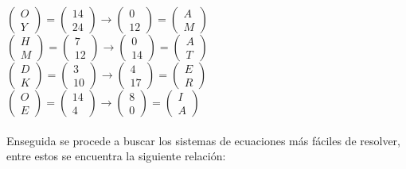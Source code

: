 \documentclass[12pt, letterpaper]{article}
\begin{document}
$
\begin{pmatrix}
O \\ Y 
\end{pmatrix}
=
\begin{pmatrix}
14 \\ 24
\end{pmatrix}
\longrightarrow
\begin{pmatrix}
0 \\ 12 
\end{pmatrix}
=
\begin{pmatrix}
A \\ M
\end{pmatrix}
$\\
$
\begin{pmatrix}
H \\ M 
\end{pmatrix}
=
\begin{pmatrix}
7 \\ 12
\end{pmatrix}
\longrightarrow
\begin{pmatrix}
0 \\ 14 
\end{pmatrix}
=
\begin{pmatrix}
A \\ T
\end{pmatrix}
$\\
$
\begin{pmatrix}
D \\ K 
\end{pmatrix}
=
\begin{pmatrix}
3 \\ 10
\end{pmatrix}
\longrightarrow
\begin{pmatrix}
4 \\ 17 
\end{pmatrix}
=
\begin{pmatrix}
E \\ R
\end{pmatrix}
$\\
$
\begin{pmatrix}
O \\ E 
\end{pmatrix}
=
\begin{pmatrix}
14 \\ 4
\end{pmatrix}
\longrightarrow
\begin{pmatrix}
8 \\ 0 
\end{pmatrix}
=
\begin{pmatrix}
I \\ A
\end{pmatrix}
$\\
\\
Enseguida se procede a buscar los sistemas de ecuaciones más fáciles de resolver, entre estos se encuentra la siguiente relación:
\end{document}
